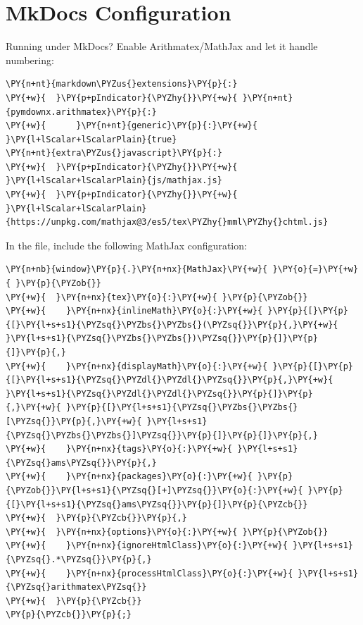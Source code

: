 \documentclass[a4paper,twoside]{article}
\begin{document}
\section{MkDocs Configuration}
Running under MkDocs? Enable Arithmatex/MathJax and let it handle numbering:
\begin{tscode}[lang=yaml, engine=pygments]
\begin{Verbatim}[commandchars=\\\{\},breaklines, breakanywhere, commandchars=\\\{\}]
\PY{n+nt}{markdown\PYZus{}extensions}\PY{p}{:}
\PY{+w}{  }\PY{p+pIndicator}{\PYZhy{}}\PY{+w}{ }\PY{n+nt}{pymdownx.arithmatex}\PY{p}{:}
\PY{+w}{      }\PY{n+nt}{generic}\PY{p}{:}\PY{+w}{ }\PY{l+lScalar+lScalarPlain}{true}
\PY{n+nt}{extra\PYZus{}javascript}\PY{p}{:}
\PY{+w}{  }\PY{p+pIndicator}{\PYZhy{}}\PY{+w}{ }\PY{l+lScalar+lScalarPlain}{js/mathjax.js}
\PY{+w}{  }\PY{p+pIndicator}{\PYZhy{}}\PY{+w}{ }\PY{l+lScalar+lScalarPlain}{https://unpkg.com/mathjax@3/es5/tex\PYZhy{}mml\PYZhy{}chtml.js}
\end{Verbatim}
\end{tscode}
In the  file, include the following MathJax configuration:
\begin{tscode}[lang=javascript, engine=pygments]
\begin{Verbatim}[commandchars=\\\{\},breaklines, breakanywhere, commandchars=\\\{\}]
\PY{n+nb}{window}\PY{p}{.}\PY{n+nx}{MathJax}\PY{+w}{ }\PY{o}{=}\PY{+w}{ }\PY{p}{\PYZob{}}
\PY{+w}{  }\PY{n+nx}{tex}\PY{o}{:}\PY{+w}{ }\PY{p}{\PYZob{}}
\PY{+w}{    }\PY{n+nx}{inlineMath}\PY{o}{:}\PY{+w}{ }\PY{p}{[}\PY{p}{[}\PY{l+s+s1}{\PYZsq{}\PYZbs{}\PYZbs{}(\PYZsq{}}\PY{p}{,}\PY{+w}{ }\PY{l+s+s1}{\PYZsq{}\PYZbs{}\PYZbs{})\PYZsq{}}\PY{p}{]}\PY{p}{]}\PY{p}{,}
\PY{+w}{    }\PY{n+nx}{displayMath}\PY{o}{:}\PY{+w}{ }\PY{p}{[}\PY{p}{[}\PY{l+s+s1}{\PYZsq{}\PYZdl{}\PYZdl{}\PYZsq{}}\PY{p}{,}\PY{+w}{ }\PY{l+s+s1}{\PYZsq{}\PYZdl{}\PYZdl{}\PYZsq{}}\PY{p}{]}\PY{p}{,}\PY{+w}{ }\PY{p}{[}\PY{l+s+s1}{\PYZsq{}\PYZbs{}\PYZbs{}[\PYZsq{}}\PY{p}{,}\PY{+w}{ }\PY{l+s+s1}{\PYZsq{}\PYZbs{}\PYZbs{}]\PYZsq{}}\PY{p}{]}\PY{p}{]}\PY{p}{,}
\PY{+w}{    }\PY{n+nx}{tags}\PY{o}{:}\PY{+w}{ }\PY{l+s+s1}{\PYZsq{}ams\PYZsq{}}\PY{p}{,}
\PY{+w}{    }\PY{n+nx}{packages}\PY{o}{:}\PY{+w}{ }\PY{p}{\PYZob{}}\PY{l+s+s1}{\PYZsq{}[+]\PYZsq{}}\PY{o}{:}\PY{+w}{ }\PY{p}{[}\PY{l+s+s1}{\PYZsq{}ams\PYZsq{}}\PY{p}{]}\PY{p}{\PYZcb{}}
\PY{+w}{  }\PY{p}{\PYZcb{}}\PY{p}{,}
\PY{+w}{  }\PY{n+nx}{options}\PY{o}{:}\PY{+w}{ }\PY{p}{\PYZob{}}
\PY{+w}{    }\PY{n+nx}{ignoreHtmlClass}\PY{o}{:}\PY{+w}{ }\PY{l+s+s1}{\PYZsq{}.*\PYZsq{}}\PY{p}{,}
\PY{+w}{    }\PY{n+nx}{processHtmlClass}\PY{o}{:}\PY{+w}{ }\PY{l+s+s1}{\PYZsq{}arithmatex\PYZsq{}}
\PY{+w}{  }\PY{p}{\PYZcb{}}
\PY{p}{\PYZcb{}}\PY{p}{;}
\end{Verbatim}
\end{tscode}
\end{document}
